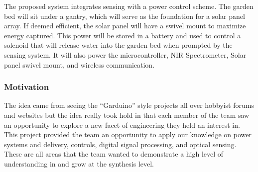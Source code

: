 The proposed system integrates sensing with a power control scheme. The garden bed will sit under a gantry, which will serve as the foundation for a solar panel array. If deemed efficient, the solar panel will have a swivel mount to maximize energy captured. This power will be stored in a battery and used to control a solenoid that will release water into the garden bed when prompted by the sensing system. It will also power the microcontroller, NIR Spectrometer, Solar panel swivel mount, and wireless communication. 
\subsubsection{Motivation}
The idea came from seeing the ``Garduino'' style projects all over hobbyist forums and websites but the idea really took hold in that each member of the team saw an opportunity to explore a new facet of engineering they held an interest in. This project provided the team an opportunity to apply our knowledge on power systems and delivery, controls, digital signal processing, and optical sensing. These are all areas that the team wanted to demonstrate a high level of understanding in and grow at the synthesis level.
